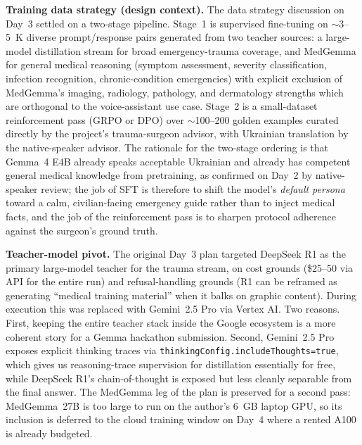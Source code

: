 \documentclass{article}
\theoremstyle{plain}
\theoremstyle{definition}
\theoremstyle{remark}
\begin{document}
\textbf{Training data strategy (design context).} The data strategy discussion on Day~3 settled on a two-stage pipeline. Stage~1 is supervised fine-tuning on $\sim$3--5~K diverse prompt/response pairs generated from two teacher sources: a large-model distillation stream for broad emergency-trauma coverage, and MedGemma for general medical reasoning (symptom assessment, severity classification, infection recognition, chronic-condition emergencies) with explicit exclusion of MedGemma's imaging, radiology, pathology, and dermatology strengths which are orthogonal to the voice-assistant use case. Stage~2 is a small-dataset reinforcement pass (GRPO or DPO) over $\sim$100--200 golden examples curated directly by the project's trauma-surgeon advisor, with Ukrainian translation by the native-speaker advisor. The rationale for the two-stage ordering is that Gemma~4 E4B already speaks acceptable Ukrainian and already has competent general medical knowledge from pretraining, as confirmed on Day~2 by native-speaker review; the job of SFT is therefore to shift the model's \emph{default persona} toward a calm, civilian-facing emergency guide rather than to inject medical facts, and the job of the reinforcement pass is to sharpen protocol adherence against the surgeon's ground truth.

\textbf{Teacher-model pivot.} The original Day~3 plan targeted DeepSeek R1 as the primary large-model teacher for the trauma stream, on cost grounds (\$25--50 via API for the entire run) and refusal-handling grounds (R1 can be reframed as generating ``medical training material'' when it balks on graphic content). During execution this was replaced with Gemini~2.5 Pro via Vertex AI. Two reasons. First, keeping the entire teacher stack inside the Google ecosystem is a more coherent story for a Gemma hackathon submission. Second, Gemini~2.5 Pro exposes explicit thinking traces via \texttt{thinkingConfig.includeThoughts=true}, which gives us reasoning-trace supervision for distillation essentially for free, while DeepSeek R1's chain-of-thought is exposed but less cleanly separable from the final answer. The MedGemma leg of the plan is preserved for a second pass: MedGemma~27B is too large to run on the author's 6~GB laptop GPU, so its inclusion is deferred to the cloud training window on Day~4 where a rented A100 is already budgeted.
\end{document}
